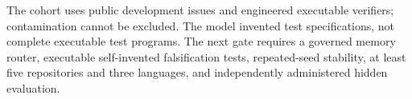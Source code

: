 The cohort uses public development issues and engineered executable verifiers;
contamination cannot be excluded.  The model invented test specifications, not
complete executable test programs.  The next gate requires a governed memory
router, executable self-invented falsification tests, repeated-seed stability,
at least five repositories and three languages, and independently administered
hidden evaluation.

